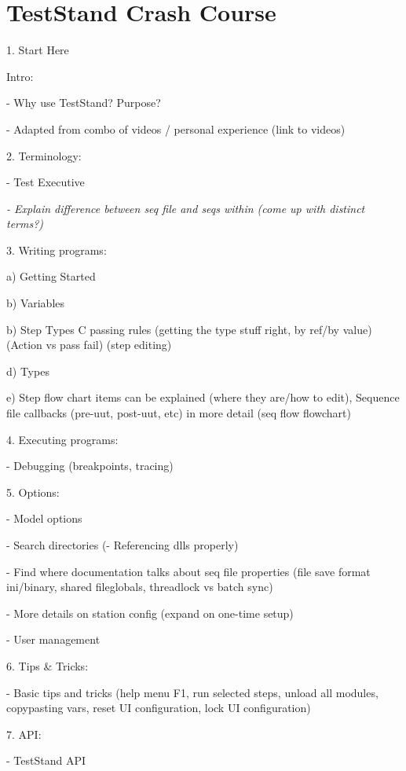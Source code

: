 \chapter{Test\+Stand Crash Course }
\hypertarget{md__test_stand_01_crash_01_course}{}\label{md__test_stand_01_crash_01_course}
1. Start Here

Intro:\+

-\/ Why use Test\+Stand? Purpose?

-\/ Adapted from combo of videos /\+ personal experience (link to videos)

2. Terminology:\+

-\/ Test Executive

{\itshape -\/ Explain difference between seq file and seqs within (come up with distinct terms?)}

3. Writing programs:\+

a) Getting Started

b) Variables

b) Step Types C passing rules (getting the type stuff right, by ref/\+by value) (Action vs pass fail) (step editing)

d) Types

e) Step flow chart items can be explained (where they are/\+how to edit), Sequence file callbacks (pre-\/uut, post-\/uut, etc) in more detail (seq flow flowchart)

4. Executing programs:\+

-\/ Debugging (breakpoints, tracing)

5. Options:\+

-\/ Model options

-\/ Search directories (-\/ Referencing dlls properly)

-\/ Find where documentation talks about seq file properties (file save format ini/\+binary, shared fileglobals, threadlock vs batch sync)

-\/ More details on station config (expand on one-\/time setup)

-\/ User management

6. Tips \& Tricks:\+

-\/ Basic tips and tricks (help menu F1, run selected steps, unload all modules, copypasting vars, reset UI configuration, lock UI configuration)

7. API:\+

-\/ Test\+Stand API 